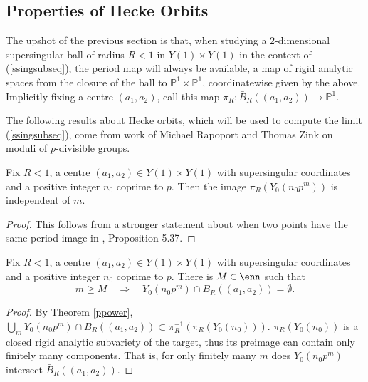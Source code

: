 \documentclass[12pt,letterpaper]{article}
\begin{document}
	\subsection{Properties of Hecke Orbits} \label{Hecke}
	
		The upshot of the previous section is that, when studying a 2-dimensional supersingular ball of radius $R<1$ in $Y(1)\times Y(1)$ in the context of (\ref{ssingsubseq}), the period map will always be available, a map of rigid analytic spaces from the closure of the ball to $\mathbb{P}^1\times \mathbb{P}^1$, coordinatewise given by the above. Implicitly fixing a centre $(a_1,a_2)$, call this map $\pi_{R}\colon\bar{B}_R((a_1,a_2))\to \mathbb{P}^1$. 
		
		The following results about Hecke orbits, which will be used to compute the limit (\ref{ssingsubseq}), come from work of Michael Rapoport and Thomas Zink on moduli of $p$-divisible groups.
	
	
	\begin{thm}\label{ppower}
		Fix $R<1$, a centre $(a_1,a_2)\in Y(1) \times Y(1)$ with supersingular coordinates and a positive integer $n_0$ coprime to $p$. Then the image $\pi_R(Y_0(n_0p^m))$ is independent of $m$. 
	\end{thm}
	
	\begin{proof}
		This follows from a stronger statement about when two points have the same period image in \cite{RZ96}, Proposition 5.37. %
	\end{proof}
	
	
	\begin{cor} \label{boundedintersections}
		Fix $R<1$, a centre $(a_1,a_2)\in Y(1) \times Y(1)$ with supersingular coordinates and a positive integer $n_0$ coprime to $p$. There is $M\in \enn$ such that \[m\geq M \quad \Longrightarrow\quad Y_0(n_0p^m)\cap \bar{B}_R((a_1,a_2))=\emptyset.\]
	\end{cor}
	
	\begin{proof}
		By Theorem \ref{ppower}, $\bigcup_m Y_0(n_0p^m)\cap \bar{B}_R((a_1,a_2)) \subset \pi_R^{-1}(\pi_R(Y_0(n_0)))$. $\pi_R(Y_0(n_0))$ is a closed rigid analytic subvariety of the target, thus its preimage can contain only finitely many components. That is, for only finitely many $m$ does $Y_0(n_0p^m)$ intersect $\bar{B}_R((a_1,a_2))$.
	\end{proof}
	
	
	
	
	
\end{document}
